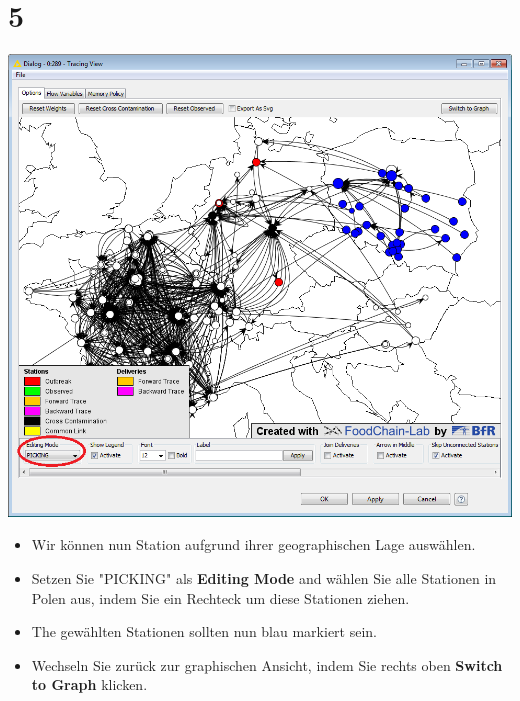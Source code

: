 \documentclass{beamer}
\begin{document}
\section{5}
\begin{frame}
	\begin{center}
  		\includegraphics[height=0.5\textheight]{5.png}
	\end{center}
	\begin{itemize}
		\item Wir können nun Station aufgrund ihrer geographischen Lage auswählen.
		\item Setzen Sie "PICKING" als \textbf{Editing Mode} and wählen Sie alle Stationen in Polen aus, indem Sie ein Rechteck um diese Stationen ziehen.
		\item The gewählten Stationen sollten nun blau markiert sein.
		\item Wechseln Sie zurück zur graphischen Ansicht, indem Sie rechts oben \textbf{Switch to Graph} klicken.
	\end{itemize}
\end{frame}
\end{document}
